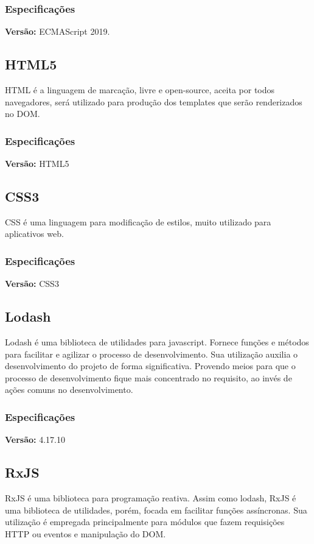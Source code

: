 \subsubsection{Especificações}
\textbf{Versão: } ECMAScript 2019.

\subsection{HTML5}
HTML é a linguagem de marcação, livre e open-source, aceita por todos navegadores, será utilizado para produção dos templates que serão 
renderizados no DOM.

\subsubsection{Especificações}
\textbf{Versão: } HTML5

\subsection{CSS3}
CSS é uma linguagem para modificação de estilos, muito utilizado para aplicativos web.

\subsubsection{Especificações}
\textbf{Versão: } CSS3

\subsection{Lodash}
\par Lodash é uma biblioteca de utilidades para javascript. Fornece funções e métodos para facilitar e agilizar o processo de desenvolvimento.  
Sua utilização auxilia o desenvolvimento do projeto de forma significativa. Provendo meios para que o processo de desenvolvimento fique mais 
concentrado no requisito, ao invés de ações comuns no desenvolvimento.

\subsubsection{Especificações}
\textbf{Versão: } 4.17.10

\subsection{RxJS}
\par RxJS é uma biblioteca para programação reativa. Assim como lodash, RxJS é uma biblioteca de utilidades, porém, focada em facilitar 
funções assíncronas. Sua utilização é empregada principalmente para módulos que fazem requisições HTTP ou eventos e manipulação do DOM.

